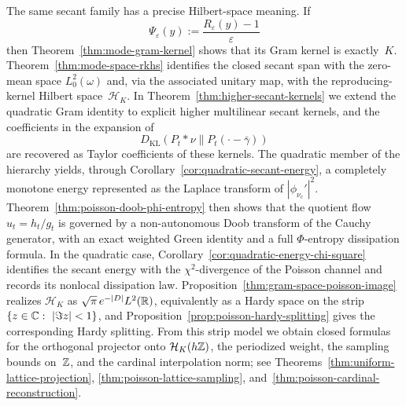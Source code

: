 The same secant family has a precise Hilbert-space meaning.  If
\[
\Psi_\varepsilon(y):=\frac{R_\varepsilon(y)-1}{\varepsilon}
\]
then Theorem~\ref{thm:mode-gram-kernel} shows that its Gram kernel is
exactly~$K$.  Theorem~\ref{thm:mode-space-rkhs} identifies the closed
secant span with the zero-mean space $L^2_0(\omega)$ and, via the
associated unitary map, with the reproducing-kernel Hilbert
space~$\mathcal H_K$.  In Theorem~\ref{thm:higher-secant-kernels} we
extend the quadratic Gram identity to explicit higher multilinear
secant kernels, and the coefficients in the expansion of
\[
D_{\mathrm{KL}}(P_t*\nu\|P_t(\cdot-\bar\gamma))
\]
are recovered as Taylor coefficients of these kernels.  The quadratic
member of the hierarchy yields, through
Corollary~\ref{cor:quadratic-secant-energy}, a completely monotone
energy represented as the Laplace transform of $|\phi_{\nu_c}'|^2$.
Theorem~\ref{thm:poisson-doob-phi-entropy} then shows that the quotient
flow $u_t=h_t/g_t$ is governed by a non-autonomous Doob transform of the
Cauchy generator, with an exact weighted Green identity and a full
$\Phi$-entropy dissipation formula.  In the quadratic case,
Corollary~\ref{cor:quadratic-energy-chi-square} identifies the secant
energy with the $\chi^2$-divergence of the Poisson channel and records
its nonlocal dissipation law.  Proposition~\ref{thm:gram-space-poisson-image}
realizes $\mathcal H_K$
as $\sqrt{\pi}\,e^{-|D|}L^2(\mathbb{R})$, equivalently as a Hardy space on the
strip $\{z\in\mathbb{C}:\ |\Im z|<1\}$, and
Proposition~\ref{prop:poisson-hardy-splitting} gives the corresponding
Hardy splitting.  From this strip model we obtain closed formulas for
the orthogonal projector onto $\mathcal H_K(h\mathbb{Z})$, the periodized
weight, the sampling bounds on~$\mathbb{Z}$, and the cardinal interpolation
norm; see
Theorems~\ref{thm:uniform-lattice-projection},
\ref{thm:poisson-lattice-sampling},
and~\ref{thm:poisson-cardinal-reconstruction}.

